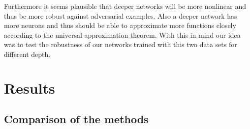 \documentclass[%
 reprint,
 amsmath,amssymb,
 aps,
]{revtex4-1}
\begin{document}
Furthermore it seems plausible that deeper networks will be more nonlinear and thus be more robust against adversarial examples. Also a deeper network has more neurons and thus should be able to approximate more functions closely according to the universal approximation theorem. With this in mind our idea was to test the robustness of our networks trained with this two data sets for different depth.



\section{Results}

\subsection{Comparison of the methods}
\end{document}
